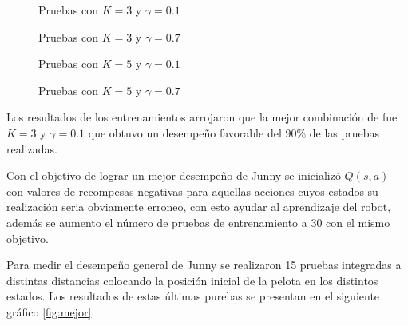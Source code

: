 \begin{figure}[h]
\caption{Pruebas con $K = 3$ y $ \gamma = 0.1 $}
\label{fig:k3y1}
\end{figure} 

\begin{figure}[h]
\caption{Pruebas con $K = 3$ y $ \gamma = 0.7 $}
\label{fig:k3y7}
\end{figure} 

\begin{figure}[h]
\caption{Pruebas con $K = 5$ y $ \gamma = 0.1 $}
\label{fig:k5y1}
\end{figure} 

\begin{figure}[h]
\caption{Pruebas con $K = 5$ y $ \gamma = 0.7 $}
\label{fig:k5y7}
\end{figure} 

Los resultados de los entrenamientos arrojaron que la mejor combinaci\'on de fue  $K = 3$ y $ \gamma = 0.1 $ que obtuvo un desempeño favorable del 90\% de las pruebas realizadas.

Con el objetivo de lograr un mejor desempeño de Junny se inicializ\'o $Q(s,a)$ con valores de recompesas negativas para aquellas acciones cuyos estados su realizaci\'on seria obviamente erroneo, con esto ayudar al aprendizaje del robot, adem\'as se aumento el n\'umero de pruebas de entrenamiento a 30 con el mismo objetivo.   

Para medir el desempeño general de Junny se realizaron 15 pruebas integradas a distintas distancias colocando la posici\'on inicial de la pelota en los distintos estados. Los resultados de estas \'ultimas purebas se presentan en el siguiente gr\'afico \ref{fig:mejor}. 

